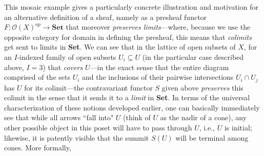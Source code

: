 \documentclass[11pt]{book}
\theoremstyle{definition}
\theoremstyle{definition}
\theoremstyle{definition}
\theoremstyle{theorem}
\theoremstyle{definition}
\begin{document}
This mosaic example gives a particularly concrete illustration and motivation for an alternative definition of a sheaf, namely as a presheaf functor $F: \mathscr{O}(X)^{op} \rightarrow \textbf{Set}$ that moreover \textit{preserves limits}---where, because we use the opposite category for domain in defining the presheaf, this means that \textit{colimits} get sent to limits in \textbf{Set}. We can see that in the lattice of open subsets of $X$, for an $I$-indexed family of open subsets $U_i \subseteq U$ (in the particular case described above, $I = 3$) that \textit{covers} $U$---in the exact sense that the entire diagram comprised of the sets $U_i$ and the inclusions of their pairwise intersections $U_i \cap U_j$ has $U$ for its colimit---the contravariant functor $S$ given above \textit{preserves} this colimit in the sense that it sends it to a \textit{limit} in \textbf{Set}. In terms of the universal characterization of these notions developed earlier, one can basically immediately see that while all arrows ``fall into" $U$ (think of $U$ as the nadir of a cone), any other possible object in this poset will have to pass through $U$, i.e., $U$ is initial; likewise, it is patently visible that the summit $S(U)$ will be terminal among cones. More formally, 
\end{document}
